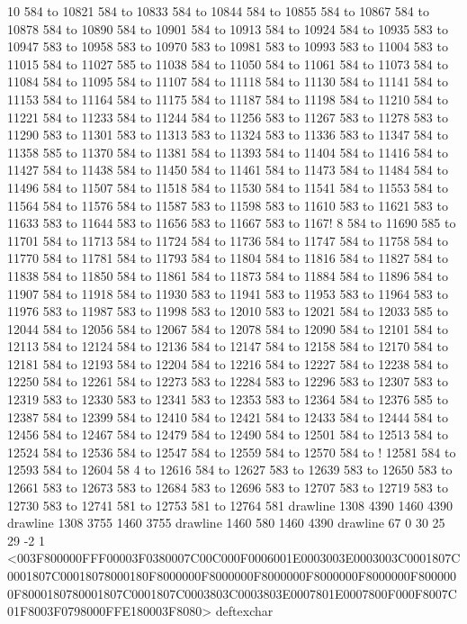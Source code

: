 10 584 to 10821 584 to 10833 584 to 10844 584 to 10855 584 to 10867 584 to 10878 584 to 10890 584 to 10901 584 to 10913 584 to 10924 584 to 10935 583 to 10947 583 to 10958 583 to 10970 583 to 10981 583 to 10993 583 to 11004 583 to 11015 584 to 11027 585 to 11038 584 to 11050 584 to 11061 584 to 11073 584 to 11084 584 to 11095 584 to 11107 584 to 11118 584 to 11130 584 to 11141 584 to 11153 584 to 11164 584 to 11175 584 to 11187 584 to 11198 584 to 11210 584 to 11221 584 to 11233 584 to 11244 584 to 11256 583 to 11267 583 to 11278 583 to 11290 583 to 11301 583 to 11313 583 to 11324 583 to 11336 583 to 11347 584 to 11358 585 to 11370 584 to 11381 584 to 11393 584 to 11404 584 to 11416 584 to 11427 584 to 11438 584 to 11450 584 to 11461 584 to 11473 584 to 11484 584 to 11496 584 to 11507 584 to 11518 584 to 11530 584 to 11541 584 to 11553 584 to 11564 584 to 11576 584 to 11587 583 to 11598 583 to 11610 583 to 11621 583 to 11633 583 to 11644 583 to 11656 583 to 11667 583 to 1167!
8 584 to 11690 585 to 11701 584 to
 11713 584 to 11724 584 to 11736 584 to 11747 584 to 11758 584 to 11770 584 to 11781 584 to 11793 584 to 11804 584 to 11816 584 to 11827 584 to 11838 584 to 11850 584 to 11861 584 to 11873 584 to 11884 584 to 11896 584 to 11907 584 to 11918 584 to 11930 583 to 11941 583 to 11953 583 to 11964 583 to 11976 583 to 11987 583 to 11998 583 to 12010 583 to 12021 584 to 12033 585 to 12044 584 to 12056 584 to 12067 584 to 12078 584 to 12090 584 to 12101 584 to 12113 584 to 12124 584 to 12136 584 to 12147 584 to 12158 584 to 12170 584 to 12181 584 to 12193 584 to 12204 584 to 12216 584 to 12227 584 to 12238 584 to 12250 584 to 12261 584 to 12273 583 to 12284 583 to 12296 583 to 12307 583 to 12319 583 to 12330 583 to 12341 583 to 12353 583 to 12364 584 to 12376 585 to 12387 584 to 12399 584 to 12410 584 to 12421 584 to 12433 584 to 12444 584 to 12456 584 to 12467 584 to 12479 584 to 12490 584 to 12501 584 to 12513 584 to 12524 584 to 12536 584 to 12547 584 to 12559 584 to 12570 584 to !
12581 584 to 12593 584 to 12604 58
4 to 12616 584 to 12627 583 to 12639 583 to 12650 583 to 12661 583 to 12673 583 to 12684 583 to 12696 583 to 12707 583 to 12719 583 to 12730 583 to 12741 581 to 12753 581 to 12764 581 drawline
1308 4390 1460 4390 drawline
1308 3755 1460 3755 drawline
1460 580 1460 4390 drawline
67 0 30 25 29 -2 1 {{<003F800000FFF00003F0380007C00C000F0006001E0003003E0003003C0001807C0001807C00018078000180F8000000F8000000F8000000F8000000F8000000F8000000F8000180780001807C0001807C0003803C0003803E0007801E0007800F000F8007C01F8003F0798000FFE180003F8080>}} deftexchar
